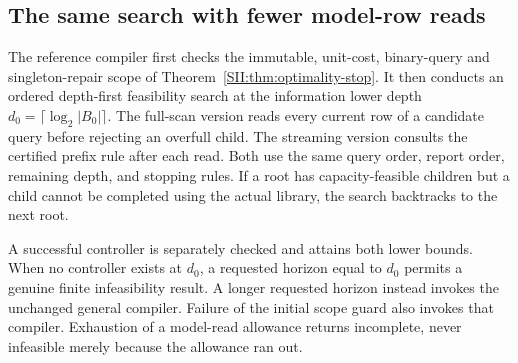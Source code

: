 \subsection{The same search with fewer model-row reads}
The reference compiler first checks the immutable, unit-cost, binary-query and singleton-repair scope of Theorem~\ref{SII:thm:optimality-stop}. It then conducts an ordered depth-first feasibility search at the information lower depth $d_0=\lceil\log_2|B_0|\rceil$. The full-scan version reads every current row of a candidate query before rejecting an overfull child. The streaming version consults the certified prefix rule after each read. Both use the same query order, report order, remaining depth, and stopping rules. If a root has capacity-feasible children but a child cannot be completed using the actual library, the search backtracks to the next root.

A successful controller is separately checked and attains both lower bounds. When no controller exists at $d_0$, a requested horizon equal to $d_0$ permits a genuine finite infeasibility result. A longer requested horizon instead invokes the unchanged general compiler. Failure of the initial scope guard also invokes that compiler. Exhaustion of a model-read allowance returns incomplete, never infeasible merely because the allowance ran out.

